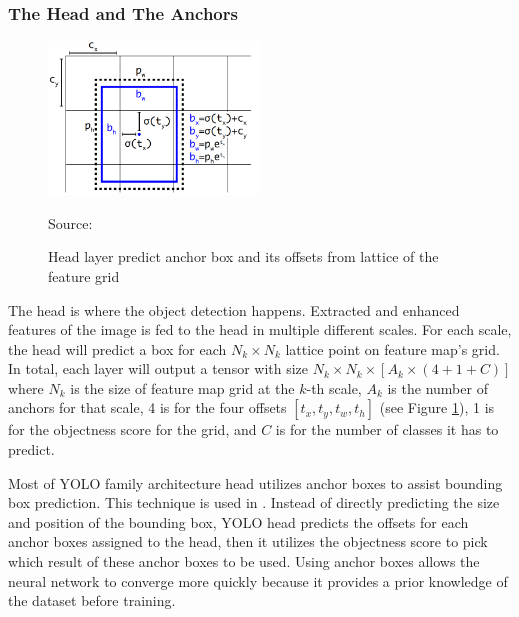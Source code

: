     \subsubsection{The Head and The Anchors}
    \begin{figure}[H]
        \centering
        \includegraphics[width=0.5\textwidth]{figures/anchorbox.png}
        \caption*{Source: \textcite{yolov3}}
        \caption{Head layer predict anchor box and its offsets from lattice of the feature grid }
        \label{fig:anchorbox}
    \end{figure}
    The head is where the object detection happens. Extracted and enhanced features of the image is fed to the head 
    in multiple different scales. For each scale, the head will predict a box for each $N_k \times N_k$
    lattice point on feature map's grid. In total, each layer will output a tensor with size
    $N_k \times N_k \times [A_k \times (4+1+C)]$ where $N_k$ is the size of feature map grid at the $k$-th scale,
    $A_k$ is the number of anchors for that scale, 4 is for the four offsets $[t_x, t_y, t_w, t_h]$ (see Figure 
    \ref{fig:anchorbox}), 1 is for the objectness score for the grid, and $C$ is for the number of classes it has
    to predict.
    
    Most of YOLO family architecture head utilizes anchor boxes to assist bounding box prediction.
    This technique is used in \textcites{yolov2}{yolov3}{yolov4}{scaledyolov4}{yolov5}{yolor}{yolov7}.
    Instead of directly predicting the size and position of the bounding box, YOLO head predicts 
    the offsets for each anchor boxes assigned to the head, then it utilizes the objectness score to pick
    which result  of these anchor boxes to be used.
    Using anchor boxes allows the neural network to converge more quickly because it provides
    a prior knowledge of the dataset before training.
    
